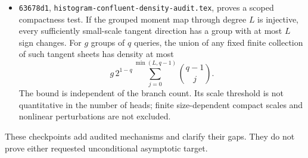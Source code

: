\documentclass[11pt]{article}
\begin{document}
\begin{itemize}
completions. The proof uses the strictly positive kernel of $q+1$
alternating signed Cauchy columns. All 1962 rational certificates
pass. Preserving descendant constraints is an explicit open step;
stacking all values merely spends one residue dimension per value.
\item \texttt{63678d1},
\texttt{histogram-confluent-density-audit.tex}, proves a scoped
compactness test. If the grouped moment map through degree $L$ is
injective, every sufficiently small-scale tangent direction has a
group with at most $L$ sign changes. For $g$ groups of $q$ queries,
the union of any fixed finite collection of such tangent sheets has
density at most
\[
 g\,2^{1-q}\sum_{j=0}^{\min(L,q-1)}\binom{q-1}{j}.
\]
The bound is independent of the branch count. Its scale threshold is
not quantitative in the number of heads; finite size-dependent
compact scales and nonlinear perturbations are not excluded.
\end{itemize}
These checkpoints add audited mechanisms and clarify their gaps.
They do not prove either requested unconditional asymptotic target.
\end{document}

